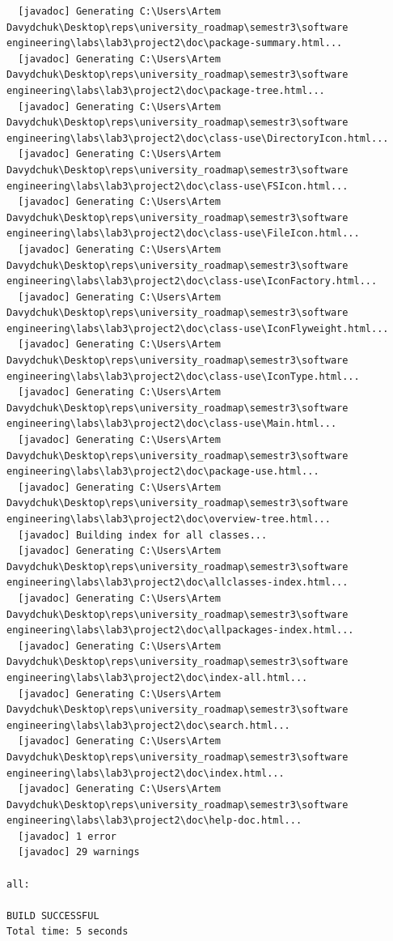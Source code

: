 \documentclass[12pt,a4paper]{article}
\begin{document}
\begin{verbatim}
  [javadoc] Generating C:\Users\Artem Davydchuk\Desktop\reps\university_roadmap\semestr3\software engineering\labs\lab3\project2\doc\package-summary.html...
  [javadoc] Generating C:\Users\Artem Davydchuk\Desktop\reps\university_roadmap\semestr3\software engineering\labs\lab3\project2\doc\package-tree.html...
  [javadoc] Generating C:\Users\Artem Davydchuk\Desktop\reps\university_roadmap\semestr3\software engineering\labs\lab3\project2\doc\class-use\DirectoryIcon.html...
  [javadoc] Generating C:\Users\Artem Davydchuk\Desktop\reps\university_roadmap\semestr3\software engineering\labs\lab3\project2\doc\class-use\FSIcon.html...
  [javadoc] Generating C:\Users\Artem Davydchuk\Desktop\reps\university_roadmap\semestr3\software engineering\labs\lab3\project2\doc\class-use\FileIcon.html...
  [javadoc] Generating C:\Users\Artem Davydchuk\Desktop\reps\university_roadmap\semestr3\software engineering\labs\lab3\project2\doc\class-use\IconFactory.html...
  [javadoc] Generating C:\Users\Artem Davydchuk\Desktop\reps\university_roadmap\semestr3\software engineering\labs\lab3\project2\doc\class-use\IconFlyweight.html...
  [javadoc] Generating C:\Users\Artem Davydchuk\Desktop\reps\university_roadmap\semestr3\software engineering\labs\lab3\project2\doc\class-use\IconType.html...
  [javadoc] Generating C:\Users\Artem Davydchuk\Desktop\reps\university_roadmap\semestr3\software engineering\labs\lab3\project2\doc\class-use\Main.html...
  [javadoc] Generating C:\Users\Artem Davydchuk\Desktop\reps\university_roadmap\semestr3\software engineering\labs\lab3\project2\doc\package-use.html...
  [javadoc] Generating C:\Users\Artem Davydchuk\Desktop\reps\university_roadmap\semestr3\software engineering\labs\lab3\project2\doc\overview-tree.html...
  [javadoc] Building index for all classes...
  [javadoc] Generating C:\Users\Artem Davydchuk\Desktop\reps\university_roadmap\semestr3\software engineering\labs\lab3\project2\doc\allclasses-index.html...
  [javadoc] Generating C:\Users\Artem Davydchuk\Desktop\reps\university_roadmap\semestr3\software engineering\labs\lab3\project2\doc\allpackages-index.html...
  [javadoc] Generating C:\Users\Artem Davydchuk\Desktop\reps\university_roadmap\semestr3\software engineering\labs\lab3\project2\doc\index-all.html...
  [javadoc] Generating C:\Users\Artem Davydchuk\Desktop\reps\university_roadmap\semestr3\software engineering\labs\lab3\project2\doc\search.html...
  [javadoc] Generating C:\Users\Artem Davydchuk\Desktop\reps\university_roadmap\semestr3\software engineering\labs\lab3\project2\doc\index.html...
  [javadoc] Generating C:\Users\Artem Davydchuk\Desktop\reps\university_roadmap\semestr3\software engineering\labs\lab3\project2\doc\help-doc.html...
  [javadoc] 1 error
  [javadoc] 29 warnings

all:

BUILD SUCCESSFUL
Total time: 5 seconds
    \end{verbatim}
\end{document}
